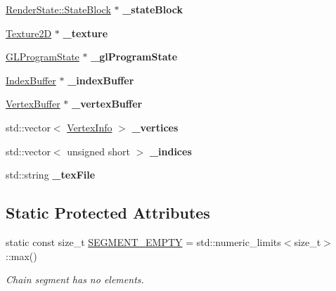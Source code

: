 \begin{DoxyCompactItemize}
\item 
\mbox{\label{classPUBillboardChain_ab93bdfbbc1df35a87c916ff1bc4e698b}} 
\hyperlink{classRenderState_1_1StateBlock}{Render\+State\+::\+State\+Block} $\ast$ {\bfseries \+\_\+state\+Block}
\item 
\mbox{\label{classPUBillboardChain_afa3ef1b03c237a7595164671024b5170}} 
\hyperlink{classTexture2D}{Texture2D} $\ast$ {\bfseries \+\_\+texture}
\item 
\mbox{\label{classPUBillboardChain_ae0384815c3245257bdcfd4801abb0ecb}} 
\hyperlink{classGLProgramState}{G\+L\+Program\+State} $\ast$ {\bfseries \+\_\+gl\+Program\+State}
\item 
\mbox{\label{classPUBillboardChain_a95773f51afd4fa8a89efbfce4a0ff521}} 
\hyperlink{classIndexBuffer}{Index\+Buffer} $\ast$ {\bfseries \+\_\+index\+Buffer}
\item 
\mbox{\label{classPUBillboardChain_a786c32cdf0b459235b9d9cd13cfa9cd9}} 
\hyperlink{classVertexBuffer}{Vertex\+Buffer} $\ast$ {\bfseries \+\_\+vertex\+Buffer}
\item 
\mbox{\label{classPUBillboardChain_a7d0bac8c829050680fc1f7aed68c372f}} 
std\+::vector$<$ \hyperlink{structPUBillboardChain_1_1VertexInfo}{Vertex\+Info} $>$ {\bfseries \+\_\+vertices}
\item 
\mbox{\label{classPUBillboardChain_a20980ea0b0650918df36ddb986f80b28}} 
std\+::vector$<$ unsigned short $>$ {\bfseries \+\_\+indices}
\item 
\mbox{\label{classPUBillboardChain_a9c2bfc2937faacb62d9f5566e27f9bfd}} 
std\+::string {\bfseries \+\_\+tex\+File}
\end{DoxyCompactItemize}
\subsection*{Static Protected Attributes}
\begin{DoxyCompactItemize}
\item 
\mbox{\label{classPUBillboardChain_acc14eff981c274012cc19a0d2d168543}} 
static const size\+\_\+t \hyperlink{classPUBillboardChain_acc14eff981c274012cc19a0d2d168543}{S\+E\+G\+M\+E\+N\+T\+\_\+\+E\+M\+P\+TY} = std\+::numeric\+\_\+limits$<$size\+\_\+t$>$\+::max()
\begin{DoxyCompactList}\small\item\em Chain segment has no elements. \end{DoxyCompactList}\end{DoxyCompactItemize}


